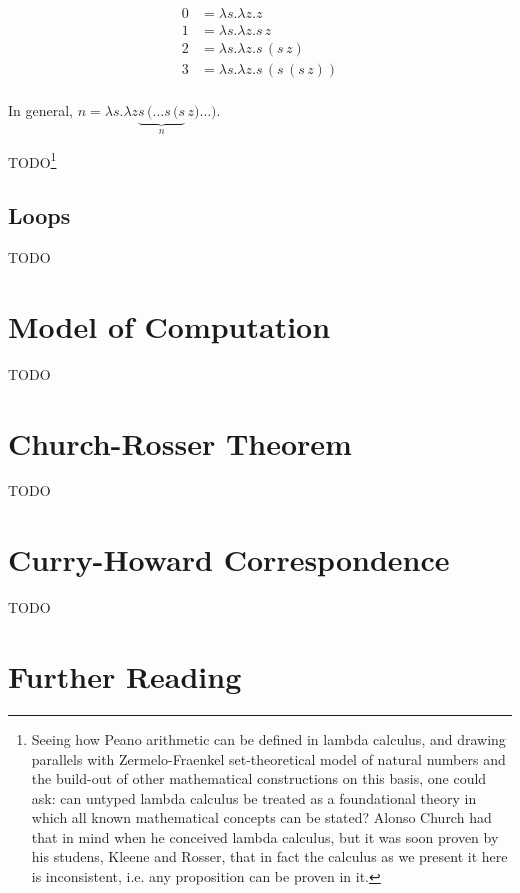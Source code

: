 \documentclass[11pt,twoside,a4paper]{article} %
\begin{document}
\begin{align*}
0 &= \lambda s.\lambda z.z \\
1 &= \lambda s.\lambda z.s\,z \\
2 &= \lambda s.\lambda z.s\,(s\,z) \\
3 &= \lambda s.\lambda z.s\,(s\,(s\,z)) \\
\end{align*}
\begin{mdframed}
In general, $n = \lambda s.\lambda z\underbrace{s\,(\dots s\,(s}_n\,z)\dots)$.
\end{mdframed}

TODO\footnote{Seeing how Peano arithmetic can be defined in lambda calculus,
and drawing parallels with Zermelo-Fraenkel set-theoretical model of
natural numbers and the build-out of other mathematical constructions on this
basis, one could ask: can untyped lambda calculus be treated as a foundational
theory in which all known mathematical concepts can be stated? Alonso Church had 
that in mind when he conceived lambda calculus, but it was soon proven by his 
studens, Kleene and Rosser\cite{wkrp}, that in fact the calculus as we present it here is 
inconsistent, i.e. any proposition can be proven in it.}

\subsection{Loops}

TODO

\section{Model of Computation}

TODO

\section{Church-Rosser Theorem}

TODO

\section{Curry-Howard Correspondence}

TODO

\section{Further Reading}
\end{document}
